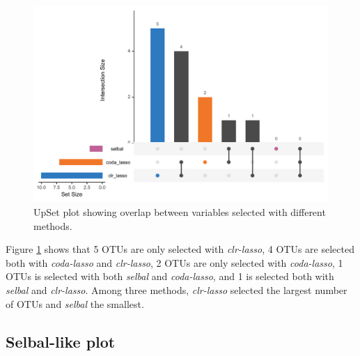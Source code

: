 \documentclass[openany]{book}
\newenvironment{Shaded}{\begin{snugshade}}{\end{snugshade}}
\newcommand{\KeywordTok}[1]{\textcolor[rgb]{0.13,0.29,0.53}{\textbf{#1}}}
\newcommand{\DataTypeTok}[1]{\textcolor[rgb]{0.13,0.29,0.53}{#1}}
\newcommand{\StringTok}[1]{\textcolor[rgb]{0.31,0.60,0.02}{#1}}
\newcommand{\CommentTok}[1]{\textcolor[rgb]{0.56,0.35,0.01}{\textit{#1}}}
\newcommand{\OtherTok}[1]{\textcolor[rgb]{0.56,0.35,0.01}{#1}}
\newcommand{\OperatorTok}[1]{\textcolor[rgb]{0.81,0.36,0.00}{\textbf{#1}}}
\newcommand{\NormalTok}[1]{#1}
\begin{document}
\begin{figure}

{\centering \includegraphics[width=1\linewidth]{./Generated_plots/upsetHFHS-1} 

}

\caption{UpSet plot showing overlap between variables selected with different methods.}\label{fig:upsetHFHS}
\end{figure}

Figure \ref{fig:upsetHFHS} shows that 5 OTUs are only selected with
\emph{clr-lasso}, 4 OTUs are selected both with \emph{coda-lasso} and
\emph{clr-lasso}, 2 OTUs are only selected with \emph{coda-lasso}, 1
OTUs is selected with both \emph{selbal} and \emph{coda-lasso}, and 1 is
selected both with \emph{selbal} and \emph{clr-lasso}. Among three
methods, \emph{clr-lasso} selected the largest number of OTUs and
\emph{selbal} the smallest.

\subsection{Selbal-like plot}\label{selbal-like-plot-1}

\begin{Shaded}
\end{Shaded}
\end{document}
